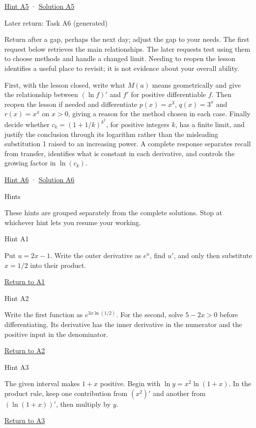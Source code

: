 \documentclass[
  11pt,
]{article}
\providecommand{\gt}{>}
\begin{document}
\protect\hyperlink{hint-a5}{Hint A5} ·
\protect\hyperlink{solution-a5}{Solution A5}

Later return: Task A6 (generated)

Return after a gap, perhaps the next day; adjust the gap to your needs.
The first request below retrieves the main relationships. The later
requests test using them to choose methods and handle a changed limit.
Needing to reopen the lesson identifies a useful place to revisit; it is
not evidence about your overall ability.

First, with the lesson closed, write what \(M(a)\) means geometrically
and give the relationship between \((\ln f)'\) and \(f'\) for positive
differentiable \(f\). Then reopen the lesson if needed and differentiate
\(p(x)=x^3\), \(q(x)=3^x\) and \(r(x)=x^x\) on \(x\gt 0\), giving a
reason for the method chosen in each case. Finally decide whether
\(c_k=(1+1/k)^{k^2}\), for positive integers \(k\), has a finite limit,
and justify the conclusion through its logarithm rather than the
misleading substitution 1 raised to an increasing power. A complete
response separates recall from transfer, identifies what is constant in
each derivative, and controls the growing factor in \(\ln(c_k)\).

\protect\hyperlink{hint-a6}{Hint A6} ·
\protect\hyperlink{solution-a6}{Solution A6}

Hints

These hints are grouped separately from the complete solutions. Stop at
whichever hint lets you resume your working.

Hint A1

Put \(u=2x-1\). Write the outer derivative as \(e^u\), find \(u'\), and
only then substitute \(x=1/2\) into their product.

\protect\hyperlink{task-a1}{Return to A1}

Hint A2

Write the first function as \(e^{3x\ln(1/2)}\). For the second, solve
\(5-2x\gt 0\) before differentiating. Its derivative has the inner
derivative in the numerator and the positive input in the denominator.

\protect\hyperlink{task-a2}{Return to A2}

Hint A3

The given interval makes \(1+x\) positive. Begin with
\(\ln y=x^2\ln(1+x)\). In the product rule, keep one contribution from
\((x^2)'\) and another from \((\ln(1+x))'\), then multiply by \(y\).

\protect\hyperlink{task-a3}{Return to A3}
\end{document}
